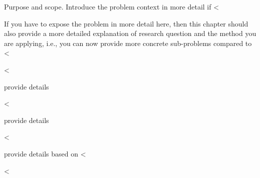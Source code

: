 \documentclass[runningheads,a4paper,english]{llncs}[2018/03/10]
\begin{document}
{\textsf{Purpose and scope}. Introduce the problem context in more detail if <%

If you have to expose the problem in more detail here, then this chapter should also provide a more detailed explanation of research question and the method you are applying, i.e., you can now provide more concrete sub-problems compared to <%

<%

provide details

<%

provide details

<%

provide details based on <%

<%

}
\end{document}
